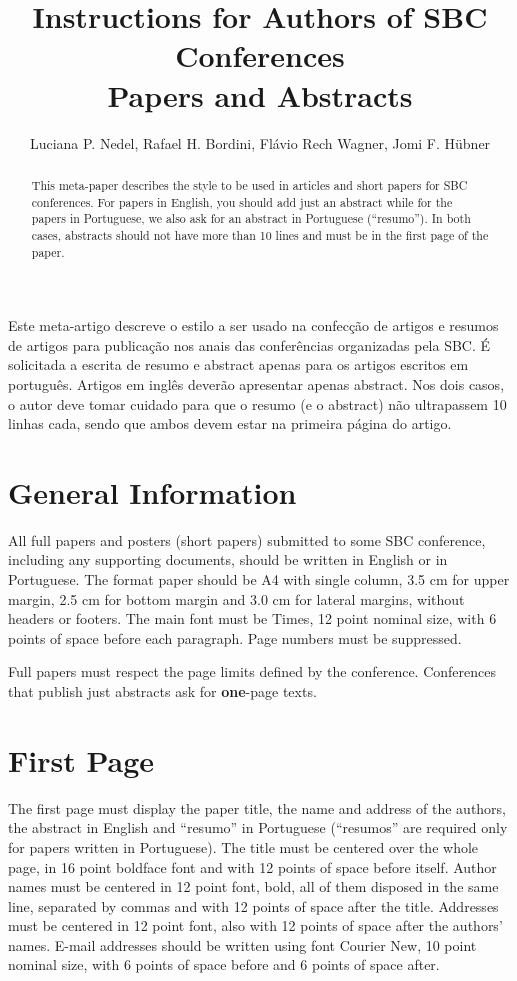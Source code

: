 \documentclass[12pt]{article}
\title{Instructions for Authors of SBC Conferences\\ Papers and Abstracts}
\author{Luciana P. Nedel\inst{1}, Rafael H. Bordini\inst{2}, Flávio Rech
  Wagner\inst{1}, Jomi F. Hübner\inst{3} }
\begin{document}
 

\maketitle

\begin{abstract}
  This meta-paper describes the style to be used in articles and short papers
  for SBC conferences. For papers in English, you should add just an abstract
  while for the papers in Portuguese, we also ask for an abstract in
  Portuguese (``resumo''). In both cases, abstracts should not have more than
  10 lines and must be in the first page of the paper.
\end{abstract}
     
\begin{resumo} 
  Este meta-artigo descreve o estilo a ser usado na confecção de artigos e
  resumos de artigos para publicação nos anais das conferências organizadas
  pela SBC. É solicitada a escrita de resumo e abstract apenas para os artigos
  escritos em português. Artigos em inglês deverão apresentar apenas abstract.
  Nos dois casos, o autor deve tomar cuidado para que o resumo (e o abstract)
  não ultrapassem 10 linhas cada, sendo que ambos devem estar na primeira
  página do artigo.
\end{resumo}


\section{General Information}

All full papers and posters (short papers) submitted to some SBC conference,
including any supporting documents, should be written in English or in
Portuguese. The format paper should be A4 with single column, 3.5 cm for upper
margin, 2.5 cm for bottom margin and 3.0 cm for lateral margins, without
headers or footers. The main font must be Times, 12 point nominal size, with 6
points of space before each paragraph. Page numbers must be suppressed.

Full papers must respect the page limits defined by the conference.
Conferences that publish just abstracts ask for \textbf{one}-page texts.

\section{First Page} \label{sec:firstpage}

The first page must display the paper title, the name and address of the
authors, the abstract in English and ``resumo'' in Portuguese (``resumos'' are
required only for papers written in Portuguese). The title must be centered
over the whole page, in 16 point boldface font and with 12 points of space
before itself. Author names must be centered in 12 point font, bold, all of
them disposed in the same line, separated by commas and with 12 points of
space after the title. Addresses must be centered in 12 point font, also with
12 points of space after the authors' names. E-mail addresses should be
written using font Courier New, 10 point nominal size, with 6 points of space
before and 6 points of space after.
\end{document}
